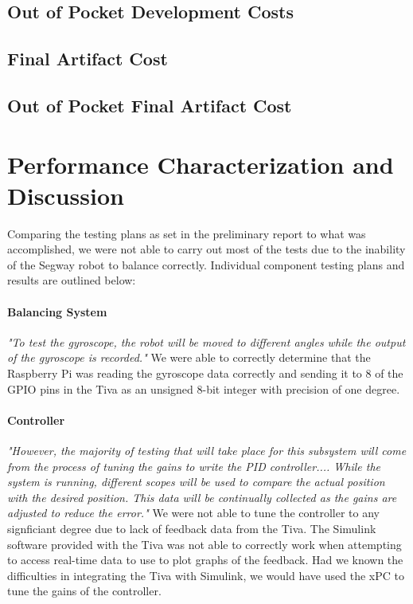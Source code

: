 \documentclass[11pt]{report}
\begin{document}
\begin{spacing}{1.5}
    \subsection*{Out of Pocket Development Costs}
    
    \subsection*{Final Artifact Cost}
    
    \subsection*{Out of Pocket Final Artifact Cost}

\section*{Performance Characterization and Discussion}

    Comparing the testing plans as set in the preliminary report to what was accomplished, we were not able to carry out most of the tests due to the inability of the Segway robot to balance correctly. Individual component testing plans and results are outlined below:
    
        \paragraph{Balancing System} \emph{"To test the gyroscope, the robot will be moved to different angles while the output of the gyroscope is recorded."} We were able to correctly determine that the Raspberry Pi was reading the gyroscope data correctly and sending it to 8 of the GPIO pins in the Tiva as an unsigned 8-bit integer with precision of one degree.
        
        \paragraph{Controller} \emph{"However, the majority of testing that will take place for this subsystem will come from the process of tuning the gains to write the PID controller.... While the system is running, different scopes will be used to compare the actual position with the desired position.  This data will be continually collected as the gains are adjusted to reduce the error."} We were not able to tune the controller to any signficiant degree due to lack of feedback data from the Tiva. The Simulink software provided with the Tiva was not able to correctly work when attempting to access real-time data to use to plot graphs of the feedback. Had we known the difficulties in integrating the Tiva with Simulink, we would have used the xPC to tune the gains of the controller.
        

\end{spacing}
\end{document}

